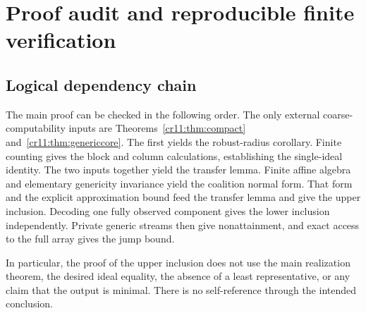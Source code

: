 \documentclass[11pt,letterpaper]{article}
\theoremstyle{plain}
\theoremstyle{definition}
\theoremstyle{remark}
\numberwithin{equation}{section}
\begin{document}
\section{Proof audit and reproducible finite verification}\label{cr11:sec:audit}

\subsection{Logical dependency chain}

The main proof can be checked in the following order. The only external
coarse-computability inputs are Theorems~\ref{cr11:thm:compact}
and~\ref{cr11:thm:genericcore}. The first yields the robust-radius corollary.
Finite counting gives the block and column calculations, establishing the
single-ideal identity. The two inputs together yield the transfer lemma.
Finite affine algebra and elementary genericity invariance yield the
coalition normal form. That form and the explicit approximation bound feed
the transfer lemma and give the upper inclusion. Decoding one fully observed
component gives the lower inclusion independently. Private generic streams
then give nonattainment, and exact access to the full array gives the jump
bound.

In particular, the proof of the upper inclusion does not use the main
realization theorem, the desired ideal equality, the absence of a least
representative, or any claim that the output is minimal. There is no
self-reference through the intended conclusion.
\end{document}
